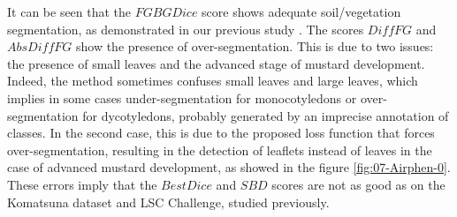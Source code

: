 \documentclass[../thesis.tex]{subfiles}
\begin{document}
    It can be seen that the $FGBGDice$ score shows adequate soil/vegetation segmentation, as demonstrated in our previous study \cite{Vayssade2021}. The scores $DiffFG$ and $AbsDiffFG$ show the presence of over-segmentation. This is due to two issues: the presence of small leaves and the advanced stage of mustard development. Indeed, the method sometimes confuses small leaves and large leaves, which implies in some cases under-segmentation for monocotyledons or over-segmentation for dycotyledons, probably generated by an imprecise annotation of classes. In the second case, this is due to the proposed loss function that forces over-segmentation, resulting in the detection of leaflets instead of leaves in the case of advanced mustard development, as showed in the figure \ref{fig:07-Airphen-0}. These errors imply that the $BestDice$ and $SBD$ scores are not as good as on the Komatsuna dataset and LSC Challenge, studied previously.
    
\end{document}
